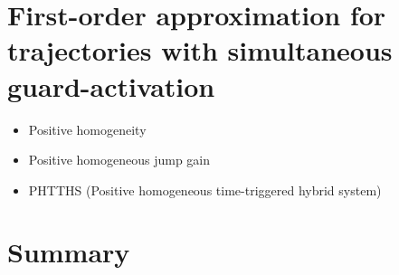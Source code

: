 \documentclass[../DC2017114Bouma.tex]{subfiles}
\begin{document}
\section{First-order approximation for trajectories with simultaneous guard-activation}
\begin{itemize}
\item Positive homogeneity
\item Positive homogeneous jump gain
\item PHTTHS (Positive homogeneous time-triggered hybrid system)
\end{itemize}
%
%
%
%
%
%

\section{Summary}
\end{document}
